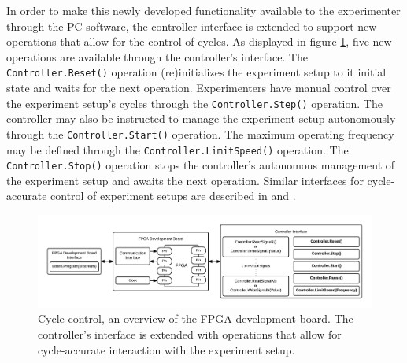 \documentclass[openright]{uva-bachelor-thesis}
\begin{document}
In order to make this newly developed functionality available to the experimenter through the PC software, the controller interface is extended to support new operations that allow for the control of cycles. As displayed in figure \ref{fig:overview-control}, five new operations are available through the controller's interface. The \texttt{Controller.Reset()} operation (re)initializes the experiment setup to it initial state and waits for the next operation. Experimenters have manual control over the experiment setup's cycles through the \texttt{Controller.Step()} operation. The controller may also be instructed to manage the experiment setup autonomously through the \texttt{Controller.Start()} operation. The maximum operating frequency may be defined through the \texttt{Controller.LimitSpeed()} operation. The \texttt{Controller.Stop()} operation stops the controller's autonomous management of the experiment setup and awaits the next operation. Similar interfaces for cycle-accurate control of experiment setups are described in \cite{holland2003harnessing} and \cite{bulic2013fpga}.

\begin{figure}[h!]
\centering
\includegraphics[width=\textwidth]{overview-control}
\caption{Cycle control, an overview of the FPGA development board. The controller's interface is extended with operations that allow for cycle-accurate interaction with the experiment setup.}
\label{fig:overview-control}
\end{figure}



\end{document}
